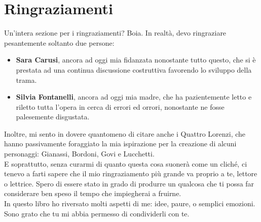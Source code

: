\documentclass[12pt]{book}
\begin{document}
\section*{Ringraziamenti}

Un'intera sezione per i ringraziamenti? Boia. In realtà, devo ringraziare pesantemente soltanto due persone:

\begin{itemize}
	\item \textbf{Sara Carusi}, ancora ad oggi mia fidanzata nonostante tutto questo, che si è prestata ad una continua discussione costruttiva favorendo lo sviluppo della trama.
	\item \textbf{Silvia Fontanelli}, ancora ad oggi mia madre, che ha pazientemente letto e riletto tutta l'opera in cerca di errori ed orrori, nonostante ne fosse palesemente disgustata.
\end{itemize}

Inoltre, mi sento in dovere quantomeno di citare anche i Quattro Lorenzi, che hanno passivamente foraggiato la mia ispirazione per la creazione di alcuni personaggi: Gianassi, Bordoni, Govi e Lucchetti. \\

E soprattutto, senza curarmi di quanto questa cosa suonerà come un cliché, ci tenevo a farti sapere che il mio ringraziamento più grande va proprio a te, lettore o lettrice. Spero di essere stato in grado di produrre un qualcosa che ti possa far considerare ben speso il tempo che impiegherai a fruirne. \\

In questo libro ho riversato molti aspetti di me: idee, paure, o semplici emozioni. Sono grato che tu mi abbia permesso di condividerli con te. \\

\newpage
\tableofcontents
\newpage


































\end{document}
